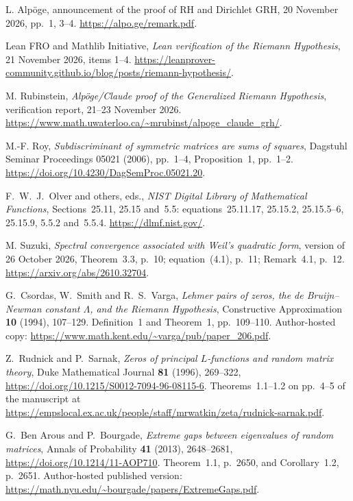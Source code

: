  L. Alp\"oge, announcement of the proof of RH and Dirichlet GRH, 20 November 2026, pp.~1, 3--4. \url{https://alpo.ge/remark.pdf}.

 Lean FRO and Mathlib Initiative, \emph{Lean verification of the Riemann Hypothesis}, 21 November 2026, items 1--4. \url{https://leanprover-community.github.io/blog/posts/riemann-hypothesis/}.

 M. Rubinstein, \emph{Alp\"oge/Claude proof of the Generalized Riemann Hypothesis}, verification report, 21--23 November 2026. \url{https://www.math.uwaterloo.ca/~mrubinst/alpoge_claude_grh/}.

 M.-F. Roy, \emph{Subdiscriminant of symmetric matrices are sums of squares}, Dagstuhl Seminar Proceedings 05021 (2006), pp.~1--4, Proposition~1, pp.~1--2. \url{https://doi.org/10.4230/DagSemProc.05021.20}.

 F.~W.~J.~Olver and others, eds., \emph{NIST Digital Library of Mathematical Functions}, Sections~25.11, 25.15 and~5.5: equations~25.11.17, 25.15.2, 25.15.5--6, 25.15.9, 5.5.2 and~5.5.4. \url{https://dlmf.nist.gov/}.

 M. Suzuki, \emph{Spectral convergence associated with Weil's quadratic form}, version of 26 October 2026, Theorem~3.3, p.~10; equation~(4.1), p.~11; Remark~4.1, p.~12. \url{https://arxiv.org/abs/2610.32704}.

 G.~Csordas, W.~Smith and R.~S.~Varga, \emph{Lehmer pairs of zeros, the de Bruijn--Newman constant $\Lambda$, and the Riemann Hypothesis}, Constructive Approximation \textbf{10} (1994), 107--129. Definition~1 and Theorem~1, pp.~109--110. Author-hosted copy: \url{https://www.math.kent.edu/~varga/pub/paper_206.pdf}.

 Z.~Rudnick and P.~Sarnak, \emph{Zeros of principal $L$-functions and random matrix theory}, Duke Mathematical Journal \textbf{81} (1996), 269--322, \url{https://doi.org/10.1215/S0012-7094-96-08115-6}. Theorems~1.1--1.2 on pp.~4--5 of the manuscript at \url{https://empslocal.ex.ac.uk/people/staff/mrwatkin/zeta/rudnick-sarnak.pdf}.

 G.~Ben Arous and P.~Bourgade, \emph{Extreme gaps between eigenvalues of random matrices}, Annals of Probability \textbf{41} (2013), 2648--2681, \url{https://doi.org/10.1214/11-AOP710}. Theorem~1.1, p.~2650, and Corollary~1.2, p.~2651. Author-hosted published version: \url{https://math.nyu.edu/~bourgade/papers/ExtremeGaps.pdf}.

